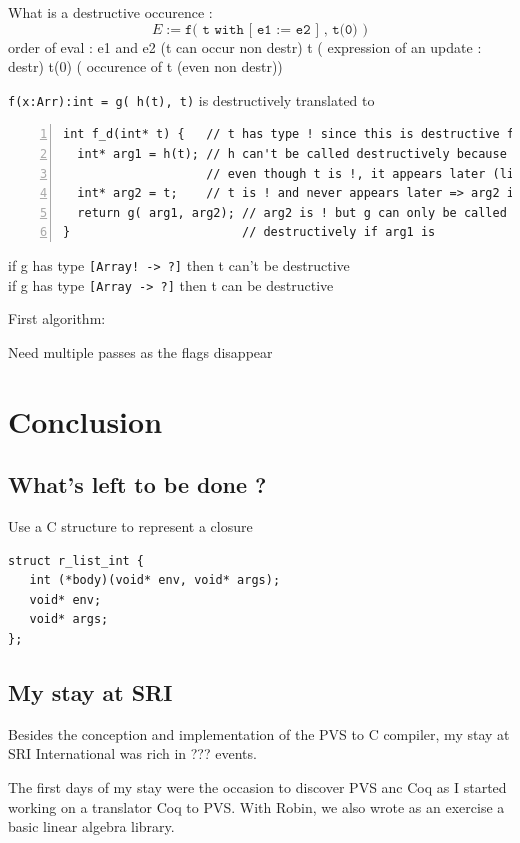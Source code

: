 \documentclass[12pt,a4paper,titlepage]{article}
\newcommand{\cl}[1]{\texttt{#1}}
\begin{document}
What is a destructive occurence :
$$ E :=  \cl{f(  t with [ e1 := e2 ] , t(0) )} $$
order of eval :
e1 and e2  (t can occur non destr)
t          ( expression of an update : destr)
t(0)       ( occurence of t (even non destr))

\cl{f(x:Arr):int = g( h(t), t)}  is destructively translated to \\
\begin{lstlisting}[numbers=left,caption=Example]
int f_d(int* t) {   // t has type ! since this is destructive f
  int* arg1 = h(t); // h can't be called destructively because
                    // even though t is !, it appears later (line 4)
  int* arg2 = t;    // t is ! and never appears later => arg2 is !
  return g( arg1, arg2); // arg2 is ! but g can only be called
}                        // destructively if arg1 is
\end{lstlisting}

if g has type \cl{[Array! -> ?]} then t can't be destructive\\

if g has type \cl{[Array -> ?]} then t can be destructive

First algorithm:


Need multiple passes as the flags disappear



\section{Conclusion}

\subsection{What's left to be done ?}

Use a C structure to represent a closure
\begin{lstlisting}
struct r_list_int {
   int (*body)(void* env, void* args);
   void* env;
   void* args;
};
\end{lstlisting}



\subsection{My stay at SRI}

Besides the conception and implementation of the PVS to C compiler, my stay at SRI International was rich in ??? events.

The first days of my stay were the occasion to discover PVS anc Coq as I started working on a translator Coq to PVS. With Robin, we also wrote as an exercise a basic linear algebra library.
\end{document}
